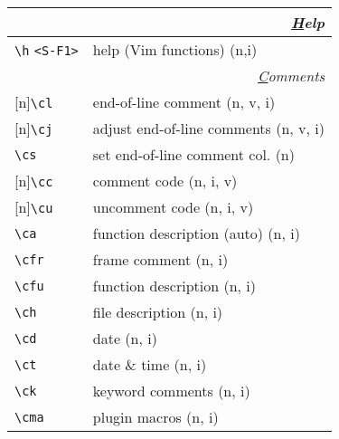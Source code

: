 \documentclass[oneside,10pt,landscape,DIV17]{scrartcl}
\newcommand{\Rep}{{\scriptsize{[n]}}}
\begin{document}
\begin{multicols}{3}
\begin{center}
\begin{tabular}[]{|p{16mm}|p{56mm}|}
\hline 
\multicolumn{2}{|r|}{\textsl{\underline{H}elp}}\\[1.0ex]
\hline \verb'\h' \verb'<S-F1>'   & help (Vim functions) \hfill (n,i)\\
\hline 
\hline
\multicolumn{2}{|r|}{\textsl{\underline{C}omments}}                       \\[1.0ex]
\hline \Rep\verb'\cl'   & end-of-line comment               \hfill (n, v, i)\\
\hline \Rep\verb'\cj'   & adjust end-of-line comments       \hfill (n, v, i)\\
\hline     \verb'\cs'   & set end-of-line comment col.      \hfill (n)   \\
\hline \Rep\verb'\cc'   & comment code                      \hfill (n, i, v)\\
\hline \Rep\verb'\cu'   & uncomment code                    \hfill (n, i, v)\\
\hline     \verb'\ca'   & function description (auto)       \hfill (n, i)\\
%
\hline     \verb'\cfr'  & frame comment                     \hfill (n, i)\\
\hline     \verb'\cfu'  & function description              \hfill (n, i)\\
\hline     \verb'\ch'   & file description                  \hfill (n, i)\\
\hline     \verb'\cd'   & date                              \hfill (n, i)\\
\hline     \verb'\ct'   & date \& time                      \hfill (n, i)\\
\hline
%
\hline     \verb'\ck'   & keyword comments                  \hfill (n, i)\\
\hline     \verb'\cma'  & plugin macros                     \hfill (n, i)\\
\hline
\end{tabular}\\

\end{center}
\end{multicols}
\end{document}
